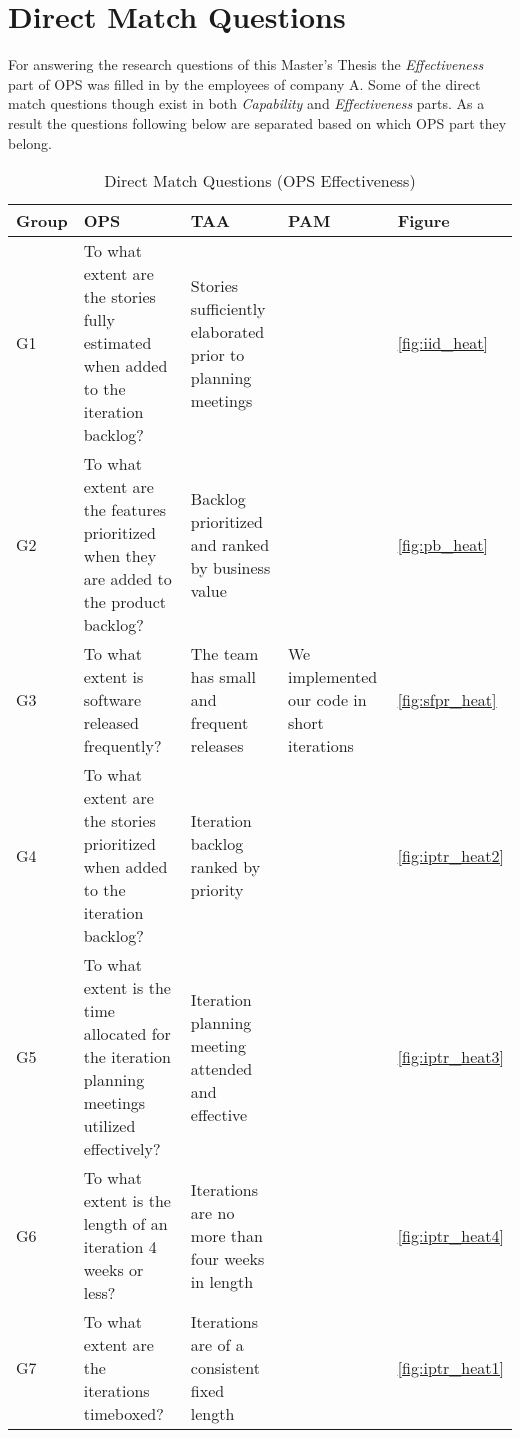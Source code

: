 \chapter{Direct Match Questions}
\label{ch:direct_match_questions}

For answering the research questions of this Master's Thesis the \textit{Effectiveness} part of \ac{OPS} was filled in by the employees of company A. Some of the direct match questions though exist in both \textit{Capability} and \textit{Effectiveness} parts. As a result the questions following below are separated based on which \ac{OPS} part they belong.

\begin{longtable} {| p{1.5cm} | p{3.6cm} | p{3.6cm} | p{3cm} | p{1.1cm} |} \caption{Direct Match Questions (OPS Effectiveness)} \\ \hline
	\label{table:direct_match_table_effectiveness} 	
		\textbf{Group} & \textbf{OPS} & \textbf{TAA}  & \textbf{PAM} & \textbf{Figure}\\ \hline \endhead
		\label{G1} G1 & To what extent are the stories fully estimated when added to the iteration backlog? & Stories sufficiently elaborated prior to planning meetings & & \ref{fig:iid_heat} \\ \hline
		\label{G2} G2 & To what extent are the features prioritized when they are added to the product backlog? & Backlog prioritized and ranked by business value & & \ref{fig:pb_heat} \\ \hline
		\label{G3} G3 & To what extent is software released frequently? & The team has small and frequent releases & We implemented our code in short iterations & \ref{fig:sfpr_heat} \\ \hline
		\label{G4} G4 & To what extent are the stories prioritized when added to the iteration backlog? & Iteration backlog ranked by priority & & \ref{fig:iptr_heat2} \\ \hline
		\label{G5} G5 & To what extent is the time allocated for the iteration planning meetings utilized effectively? & Iteration planning meeting attended and effective & & \ref{fig:iptr_heat3}\\ \hline
		\label{G6} G6 & To what extent is the length of an iteration 4 weeks or less? & Iterations are no more than four weeks in length & & \ref{fig:iptr_heat4} \\ \hline
		\label{G7} G7 & To what extent are the iterations timeboxed? & Iterations are of a consistent fixed length &  & \ref{fig:iptr_heat1} \\ \hline

\end{longtable}
